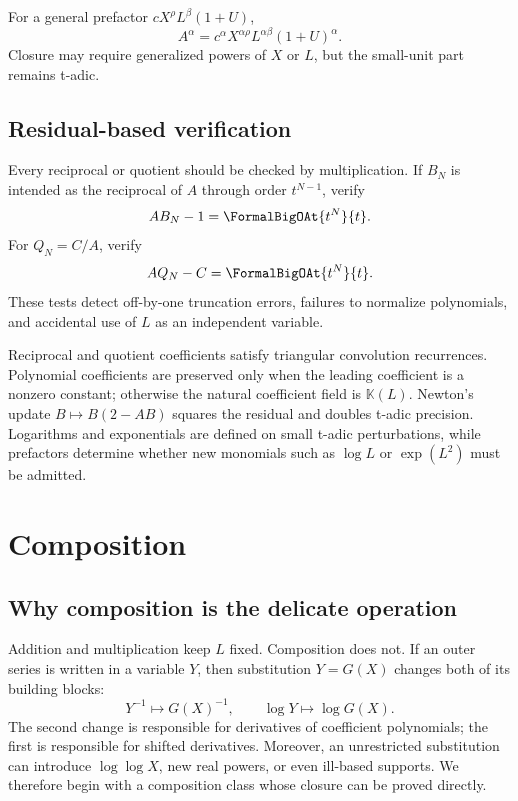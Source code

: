 \documentclass[11pt,openany]{book}
\theoremstyle{definition}
\theoremstyle{plain}
\theoremstyle{remark}
\newcommand{\K}{\mathbb{K}}
\begin{document}
For a general prefactor \(cX^\rho L^\beta(1+U)\),
\[
 A^\alpha=c^\alpha X^{\alpha\rho}L^{\alpha\beta}(1+U)^\alpha.
\]
Closure may require generalized powers of \(X\) or \(L\), but the small-unit
part remains t-adic.

\section{Residual-based verification}
Every reciprocal or quotient should be checked by multiplication.  If
\(B_N\) is intended as the reciprocal of \(A\) through order \(t^{N-1}\), verify
\begin{equation}\label{eq:recip-residual-test}
 AB_N-1=\FormalBigOAt{t^N}{t}.
\end{equation}
For \(Q_N=C/A\), verify
\[
 AQ_N-C=\FormalBigOAt{t^N}{t}.
\]
These tests detect off-by-one truncation errors, failures to normalize
polynomials, and accidental use of \(L\) as an independent variable.

\begin{summarybox}
Reciprocal and quotient coefficients satisfy triangular convolution
recurrences.  Polynomial coefficients are preserved only when the leading
coefficient is a nonzero constant; otherwise the natural coefficient field is
\(\K(L)\).  Newton's update \(B\mapsto B(2-AB)\) squares the residual and
doubles t-adic precision.  Logarithms and exponentials are defined on small
t-adic perturbations, while prefactors determine whether new monomials such as
\(\log L\) or \(\exp(L^2)\) must be admitted.
\end{summarybox}

\chapter{Composition}\label{ch:composition}

\section{Why composition is the delicate operation}
Addition and multiplication keep \(L\) fixed.  Composition does not.  If an
outer series is written in a variable \(Y\), then substitution \(Y=G(X)\)
changes both of its building blocks:
\[
 Y^{-1}\longmapsto G(X)^{-1},
 \qquad
 \log Y\longmapsto\log G(X).
\]
The second change is responsible for derivatives of coefficient polynomials;
the first is responsible for shifted derivatives.  Moreover, an unrestricted
substitution can introduce \(\log\log X\), new real powers, or even ill-based
supports.  We therefore begin with a composition class whose closure can be
proved directly.
\end{document}
